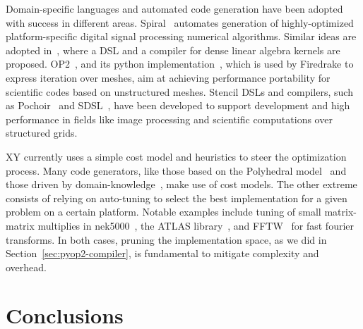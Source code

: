 \documentclass[conference]{IEEEtran}
\begin{document}
Domain-specific languages and automated code generation have been adopted with success in different areas. Spiral~\cite{Pueschel:05} automates generation of highly-optimized platform-specific digital signal processing numerical algorithms. Similar ideas are adopted in~\cite{Spampinato:14}, where a DSL and a compiler for dense linear algebra kernels are proposed. OP2~\cite{op2-main}, and its python implementation~\cite{pyop2isc}, which is used by Firedrake to express iteration over meshes, aim at achieving performance portability for scientific codes based on unstructured meshes. Stencil DSLs and compilers, such as Pochoir~\cite{pochoir} and SDSL~\cite{stencil-compiler}, have been developed to support development and high performance in fields like image processing and scientific computations over structured grids.  

XY currently uses a simple cost model and heuristics to steer the optimization process. Many code generators, like those based on the Polyhedral model~\cite{PLUTO} and those driven by domain-knowledge~\cite{modeldriven}, make use of cost models. The other extreme consists of relying on auto-tuning to select the best implementation for a given problem on a certain platform. Notable examples include tuning of small matrix-matrix multiplies in nek5000~\cite{nek5000}, the ATLAS library~\cite{ATLAS}, and FFTW~\cite{FFTW} for fast fourier transforms. In both cases, pruning the implementation space, as we did in Section~\ref{sec:pyop2-compiler}, is fundamental to mitigate complexity and overhead. 




\section{Conclusions}
\label{sec:conclusions}
\end{document}
